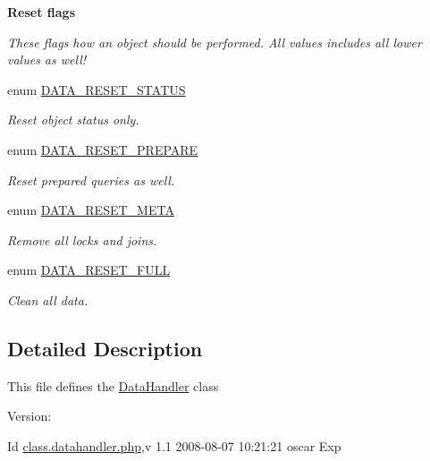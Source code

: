 \begin{Indent}{\bf Reset flags}\par
{\em These flags how an object should be performed. All values includes all lower values as well! }\begin{CompactItemize}
\item 
enum \hyperlink{class_8datahandler_8php_9266811d651cb3ff8c5fdf00111e677b}{DATA\_\-RESET\_\-STATUS} 
\begin{CompactList}\small\item\em Reset object status only. \item\end{CompactList}\item 
enum \hyperlink{class_8datahandler_8php_19a99423705b41e563424ae76d7fe184}{DATA\_\-RESET\_\-PREPARE} 
\begin{CompactList}\small\item\em Reset prepared queries as well. \item\end{CompactList}\item 
enum \hyperlink{class_8datahandler_8php_3ce9f928f9ba75096925bd4157246bbb}{DATA\_\-RESET\_\-META} 
\begin{CompactList}\small\item\em Remove all locks and joins. \item\end{CompactList}\item 
enum \hyperlink{class_8datahandler_8php_2a28429433990da242faa223d5a49f0a}{DATA\_\-RESET\_\-FULL} 
\begin{CompactList}\small\item\em Clean all data. \item\end{CompactList}\end{CompactItemize}
\end{Indent}


\subsection{Detailed Description}
This file defines the \hyperlink{classDataHandler}{DataHandler} class \begin{Desc}
\item[Version:]\end{Desc}
\begin{Desc}
\item[Id]\hyperlink{class_8datahandler_8php}{class.datahandler.php},v 1.1 2008-08-07 10:21:21 oscar Exp \end{Desc}



